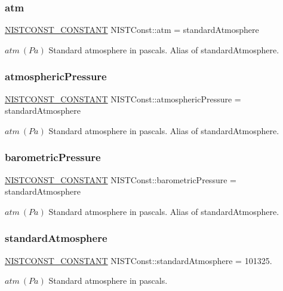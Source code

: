 \subsubsection{\texorpdfstring{atm}{atm}}
{\footnotesize\ttfamily \mbox{\hyperlink{group___n_i_s_t_const-_macros_ga2b0fc1d7452373f816175dd86ce26729}{N\+I\+S\+T\+C\+O\+N\+S\+T\+\_\+\+C\+O\+N\+S\+T\+A\+NT}} N\+I\+S\+T\+Const\+::atm = standard\+Atmosphere}

$atm \ (Pa)$ Standard atmosphere in pascals. Alias of standard\+Atmosphere. \mbox{\label{group___n_i_s_t_const-_standard_atmosphere_ga290009de599caeda81dd8578d350a6f8}} 
\subsubsection{\texorpdfstring{atmospheric\+Pressure}{atmosphericPressure}}
{\footnotesize\ttfamily \mbox{\hyperlink{group___n_i_s_t_const-_macros_ga2b0fc1d7452373f816175dd86ce26729}{N\+I\+S\+T\+C\+O\+N\+S\+T\+\_\+\+C\+O\+N\+S\+T\+A\+NT}} N\+I\+S\+T\+Const\+::atmospheric\+Pressure = standard\+Atmosphere}

$atm \ (Pa)$ Standard atmosphere in pascals. Alias of standard\+Atmosphere. \mbox{\label{group___n_i_s_t_const-_standard_atmosphere_gaa8cf0b181989db163a5305d0f3d3caad}} 
\subsubsection{\texorpdfstring{barometric\+Pressure}{barometricPressure}}
{\footnotesize\ttfamily \mbox{\hyperlink{group___n_i_s_t_const-_macros_ga2b0fc1d7452373f816175dd86ce26729}{N\+I\+S\+T\+C\+O\+N\+S\+T\+\_\+\+C\+O\+N\+S\+T\+A\+NT}} N\+I\+S\+T\+Const\+::barometric\+Pressure = standard\+Atmosphere}

$atm \ (Pa)$ Standard atmosphere in pascals. Alias of standard\+Atmosphere. \mbox{\label{group___n_i_s_t_const-_standard_atmosphere_ga6b5951b0dbdf131bb3138565e0828e79}} 
\subsubsection{\texorpdfstring{standard\+Atmosphere}{standardAtmosphere}}
{\footnotesize\ttfamily \mbox{\hyperlink{group___n_i_s_t_const-_macros_ga2b0fc1d7452373f816175dd86ce26729}{N\+I\+S\+T\+C\+O\+N\+S\+T\+\_\+\+C\+O\+N\+S\+T\+A\+NT}} N\+I\+S\+T\+Const\+::standard\+Atmosphere = 101325.}

$atm \ (Pa)$ Standard atmosphere in pascals. 